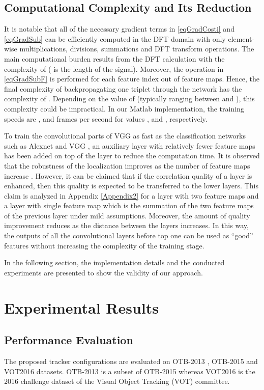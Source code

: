\documentclass[journal]{IEEEtran}
\begin{document}
\subsection{Computational Complexity and Its Reduction}
\label{secComplexity}
It is notable that all of the necessary gradient terms in \eqref{eqGradCosti} and \eqref{eqGradSub} can be efficiently computed in the DFT domain with only element-wise multiplications, divisions, summations and DFT transform operations. The main computational burden results from the DFT calculation with the complexity of  ( is the length of the signal). Moreover, the operation in \eqref{eqGradSubF} is performed for each feature index out of  feature maps. Hence, the final complexity of backpropagating one triplet through the network has the complexity of . Depending on the value of  (typically ranging between  and ), this complexity could be impractical. In our Matlab implementation, the training speeds are ,  and  frames per second for  values ,  and , respectively.

To train the convolutional parts of VGG as fast as the classification networks such as Alexnet \cite{ImageNetCNN} and VGG \cite{VGG}, an auxiliary layer with relatively fewer feature maps has been added on top of the  layer to reduce the computation time. It is observed that the robustness of the localization improves as the number of feature maps increase \cite{CCOT,deepSRDCF}. However, it can be claimed that if the correlation quality of a layer is enhanced, then this quality is expected to be transferred to the lower layers. This claim is analyzed in Appendix \ref{Appendix2} for a layer with two feature maps and a layer with single feature map which is the summation of the two feature maps of the previous layer under mild assumptions. Moreover, the amount of quality improvement reduces as the distance between the layers increases. In this way, the outputs of all the convolutional layers before top one can be used as ``good'' features without increasing the complexity of the training stage.

In the following section, the implementation details and the conducted experiments are presented to show the validity of our approach.
\section{Experimental Results}
\label{secExperiments}
\subsection{Performance Evaluation}
The proposed tracker configurations are evaluated on OTB-2013 \cite{Benchmark2013}, OTB-2015 \cite{BenchmarkPAMI} and VOT2016 \cite{VOT2016} datasets. OTB-2013 is a subset of OTB-2015 whereas VOT2016 is the 2016 challenge dataset of the Visual Object Tracking (VOT) committee.
\end{document}
